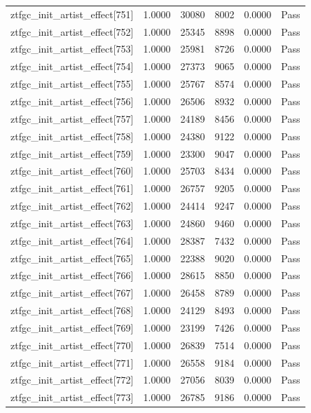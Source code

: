 \begin{table}[htbp]
\begin{tabular}{llrrll}
ztfgc\_init\_artist\_effect[751] & 1.0000 & 30080 & 8002 & 0.0000 & Pass \\
ztfgc\_init\_artist\_effect[752] & 1.0000 & 25345 & 8898 & 0.0000 & Pass \\
ztfgc\_init\_artist\_effect[753] & 1.0000 & 25981 & 8726 & 0.0000 & Pass \\
ztfgc\_init\_artist\_effect[754] & 1.0000 & 27373 & 9065 & 0.0000 & Pass \\
ztfgc\_init\_artist\_effect[755] & 1.0000 & 25767 & 8574 & 0.0000 & Pass \\
ztfgc\_init\_artist\_effect[756] & 1.0000 & 26506 & 8932 & 0.0000 & Pass \\
ztfgc\_init\_artist\_effect[757] & 1.0000 & 24189 & 8456 & 0.0000 & Pass \\
ztfgc\_init\_artist\_effect[758] & 1.0000 & 24380 & 9122 & 0.0000 & Pass \\
ztfgc\_init\_artist\_effect[759] & 1.0000 & 23300 & 9047 & 0.0000 & Pass \\
ztfgc\_init\_artist\_effect[760] & 1.0000 & 25703 & 8434 & 0.0000 & Pass \\
ztfgc\_init\_artist\_effect[761] & 1.0000 & 26757 & 9205 & 0.0000 & Pass \\
ztfgc\_init\_artist\_effect[762] & 1.0000 & 24414 & 9247 & 0.0000 & Pass \\
ztfgc\_init\_artist\_effect[763] & 1.0000 & 24860 & 9460 & 0.0000 & Pass \\
ztfgc\_init\_artist\_effect[764] & 1.0000 & 28387 & 7432 & 0.0000 & Pass \\
ztfgc\_init\_artist\_effect[765] & 1.0000 & 22388 & 9020 & 0.0000 & Pass \\
ztfgc\_init\_artist\_effect[766] & 1.0000 & 28615 & 8850 & 0.0000 & Pass \\
ztfgc\_init\_artist\_effect[767] & 1.0000 & 26458 & 8789 & 0.0000 & Pass \\
ztfgc\_init\_artist\_effect[768] & 1.0000 & 24129 & 8493 & 0.0000 & Pass \\
ztfgc\_init\_artist\_effect[769] & 1.0000 & 23199 & 7426 & 0.0000 & Pass \\
ztfgc\_init\_artist\_effect[770] & 1.0000 & 26839 & 7514 & 0.0000 & Pass \\
ztfgc\_init\_artist\_effect[771] & 1.0000 & 26558 & 9184 & 0.0000 & Pass \\
ztfgc\_init\_artist\_effect[772] & 1.0000 & 27056 & 8039 & 0.0000 & Pass \\
ztfgc\_init\_artist\_effect[773] & 1.0000 & 26785 & 9186 & 0.0000 & Pass \\

\end{tabular}
\end{table}
